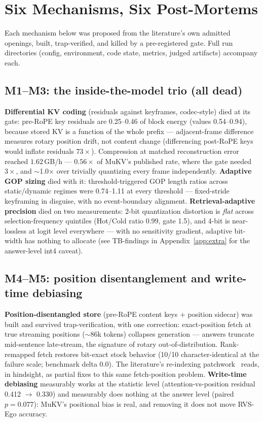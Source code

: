 \section{Six Mechanisms, Six Post-Mortems}
\label{sec:mech}

Each mechanism below was proposed from the literature's own admitted openings, built, trap-verified, and killed by a pre-registered gate. Full run directories (config, environment, code state, metrics, judged artifacts) accompany each.

\subsection{M1--M3: the inside-the-model trio (all dead)}
\textbf{Differential KV coding} (residuals against keyframes, codec-style) died at its gate: pre-RoPE key residuals are 0.25--0.46 of block energy (values 0.54--0.94), because stored KV is a function of the whole prefix — adjacent-frame difference measures rotary position drift, not content change (differencing post-RoPE keys would inflate residuals $73\times$). Compression at matched reconstruction error reached $1.62$\,GB/h — $0.56\times$ of MuKV's published rate, where the gate needed $3\times$, and $\sim$1.0$\times$ over trivially quantizing every frame independently. \textbf{Adaptive GOP sizing} died with it: threshold-triggered GOP length ratios across static/dynamic regimes were 0.74--1.11 at every threshold — fixed-stride keyframing in disguise, with no event-boundary alignment. \textbf{Retrieval-adaptive precision} died on two measurements: 2-bit quantization distortion is \emph{flat} across selection-frequency quintiles (Hot/Cold ratio 0.99, gate 1.5), and 4-bit is near-lossless at logit level everywhere — with no sensitivity gradient, adaptive bit-width has nothing to allocate (see TB-findings in Appendix~\ref{app:extra} for the answer-level int4 caveat).

\subsection{M4--M5: position disentanglement and write-time debiasing}
\textbf{Position-disentangled store} (pre-RoPE content keys + position sidecar) was built and survived trap-verification, with one correction: exact-position fetch at true streaming positions ($\sim$86k tokens) collapses generation — answers truncate mid-sentence late-stream, the signature of rotary out-of-distribution. Rank-remapped fetch restores bit-exact stock behavior (10/10 character-identical at the failure scale; benchmark delta 0.0). The literature's re-indexing patchwork~\cite{livevlm,streammem,hermes} reads, in hindsight, as partial fixes to this same fetch-position problem. \textbf{Write-time debiasing} measurably works at the statistic level (attention-vs-position residual 0.412 $\to$ 0.330) and measurably does nothing at the answer level (paired $p{=}0.077$): MuKV's positional bias is real, and removing it does not move RVS-Ego accuracy.

